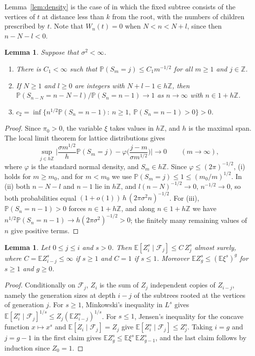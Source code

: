 \documentclass[11pt]{amsart}
\newtheorem{lemma}[theorem]{Lemma}
\theoremstyle{remark}
\numberwithin{equation}{section}
\newcommand{\Pp}{\mathbb P}
\newcommand{\E}{\mathbb E}
\newcommand{\Z}{\mathbb Z}
\newcommand{\cF}{\mathcal F}
\begin{document}
Lemma~\ref{lem:density} is the case of \cite[Lemma~15.9]{J12} in which the fixed subtree consists of the vertices of $t$ at distance less than $k$ from the root, with the numbers of children prescribed by $t$. Note that $W_n(t)=0$ when $N<n<N+l$, since then $n-N-l<0$.

\begin{lemma}\label{lem:llt}
Suppose that $\sigma^2<\infty$.
\begin{enumerate}[label=\textup{(\roman*)}]
\item There is $C_1<\infty$ such that $\Pp(S_m=j)\le C_1m^{-1/2}$ for all $m\ge1$ and $j\in\Z$.
\item If $N\ge1$ and $l\ge0$ are integers with $N+l-1\in h\Z$, then $\Pp(S_{n-N}=n-N-l)/\Pp(S_n=n-1)\to1$ as $n\to\infty$ with $n\in1+h\Z$.
\item $c_2=\inf\{n^{1/2}\Pp(S_n=n-1):\ n\ge1,\ \Pp(S_n=n-1)>0\}>0$.
\end{enumerate}
\end{lemma}

\begin{proof}
Since $\pi_0>0$, the variable $\xi$ takes values in $h\Z$, and $h$ is the maximal span. The local limit theorem for lattice distributions \cite[Theorem~4.2.1]{IL71} gives
\[
\sup_{j\in h\Z}\Big|\frac{\sigma m^{1/2}}{h}\Pp(S_m=j)-\varphi\Big(\frac{j-m}{\sigma m^{1/2}}\Big)\Big|\to0\qquad(m\to\infty),
\]
where $\varphi$ is the standard normal density, and $S_m\in h\Z$. Since $\varphi\le(2\pi)^{-1/2}$, (i) holds for $m\ge m_0$, and for $m<m_0$ we use $\Pp(S_m=j)\le1\le(m_0/m)^{1/2}$. In (ii) both $n-N-l$ and $n-1$ lie in $h\Z$, and $l(n-N)^{-1/2}\to0$, $n^{-1/2}\to0$, so both probabilities equal $(1+o(1))\,h\,(2\pi\sigma^2n)^{-1/2}$. For (iii), $\Pp(S_n=n-1)>0$ forces $n\in1+h\Z$, and along $n\in1+h\Z$ we have $n^{1/2}\Pp(S_n=n-1)\to h(2\pi\sigma^2)^{-1/2}>0$; the finitely many remaining values of $n$ give positive terms.
\end{proof}

\begin{lemma}\label{lem:moments}
Let $0\le j\le i$ and $s>0$. Then $\E[Z_i^s\mid\cF_j]\le C\,Z_j^s$ almost surely, where $C=\E Z_{i-j}^s\le\infty$ if $s\ge1$ and $C=1$ if $s\le1$. Moreover $\E Z_g^s\le(\E\xi^s)^g$ for $s\ge1$ and $g\ge0$.
\end{lemma}

\begin{proof}
Conditionally on $\cF_j$, $Z_i$ is the sum of $Z_j$ independent copies of $Z_{i-j}$, namely the generation sizes at depth $i-j$ of the subtrees rooted at the vertices of generation $j$. For $s\ge1$, Minkowski's inequality in $L^s$ gives $\E[Z_i^s\mid\cF_j]^{1/s}\le Z_j(\E Z_{i-j}^s)^{1/s}$. For $s\le1$, Jensen's inequality for the concave function $x\mapsto x^s$ and $\E[Z_i\mid\cF_j]=Z_j$ give $\E[Z_i^s\mid\cF_j]\le Z_j^s$. Taking $i=g$ and $j=g-1$ in the first claim gives $\E Z_g^s\le\E\xi^s\,\E Z_{g-1}^s$, and the last claim follows by induction since $Z_0=1$.
\end{proof}
\end{document}
